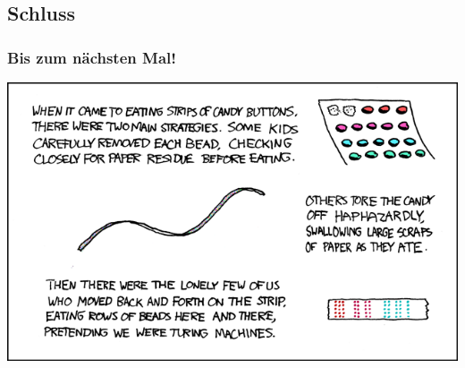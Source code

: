 \subsection{Schluss}
\begin{frame}
\frametitle{Bis zum nächsten Mal!}
\begin{center}
  \includegraphics[width=1 \textheight]{images/xkcd_205.png}
\end{center}
\end{frame}

